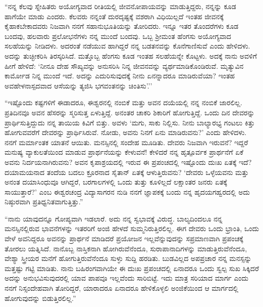 “ನನ್ನ ಕೆಲವು ಸ್ನೇಹಿತರು ಅಯೋಗ್ಯವಾದ ರೀತಿಯಲ್ಲಿ ಜೀವನೋಪಾಯವನ್ನು ಮಾಡುತ್ತಿದ್ದರು, ನನ್ನನ್ನು ಕೂಡ ಹಾಗೆಯೇ ಮಾಡು ಎಂದರು. ಕೆಲವರು ನನ್ನಂತೆ ದುರದೃಷ್ಟಕ್ಕೆ ವಶರಾಗಿ ವಿಧಿಯಿಲ್ಲದೆ ಇಂತಹ ಜೀವನಕ್ಕೆ ಕೈಹಾಕಬೇಕಾದವರು ನಿಜವಾಗಿ ನನಗೆ ಸಹಾನುಭೂತಿಯನ್ನು ತೋರಿದರು. ಇನ್ನೂ ಇತರ ತೊಂದರೆಗಳು ಕೂಡ ಬಂದವು, ಹಲವಾರು ಪ್ರಲೋಭನೆಗಳು ನನ್ನ ಮುಂದೆ ಬಂದವು. ಒಬ್ಬ ಶ‍್ರೀಮಂತ ಹೆಂಗಸು ಅಯೋಗ್ಯವಾದ ಸಲಹೆಯನ್ನು ನೀಡಿದಳು. ಅದರಂತೆ ನಡೆಯುವ ಹಾಗಿದ್ದರೆ ನನ್ನ ಬಡತನವನ್ನು ಕೊನೆಗಾಣಿಸುವೆ ಎಂದು ಹೇಳಿದಳು. ಅದನ್ನು ತುಚ್ಛೀಕರಿಸಿ ತಿರಸ್ಕರಿಸಿದೆ. ಮತ್ತೊಬ್ಬ ಹೆಂಗಸು ಕೂಡ ಇಂತಹ ಸಲಹೆಯನ್ನೇ ಕೊಟ್ಟಳು. ಅದಕ್ಕೆ ನಾನು ಅವಳಿಗೆ ಹೀಗೆ ಹೇಳಿದೆ: ‘ನೀನೂ ದೇಹ ಸೌಖ್ಯವನ್ನು ಅನುಸರಿಸಿ ನಿನ್ನ ಜೀವನವನ್ನು ವ್ಯರ್ಥಮಾಡಿಕೊಂಡಿರುವೆ. ಮೃತ್ಯುವಿನ ಕಾರ್ಮೋಡ ನಿನ್ನ ಮುಂದೆ ಇದೆ. ಅದನ್ನು ಎದುರಿಸುವುದಕ್ಕೆ ನೀನು ಏನನ್ನಾದರೂ ಮಾಡಿರುವೆಯಾ? ಇಂತಹ ಅವಹೇಳನಾಸ್ಪದವಾದ ಆಸೆಯನ್ನು ತ್ಯಜಿಸಿ ಭಗವಂತನನ್ನು ಚಿಂತಿಸು’.’’

“ಇಷ್ಟೊಂದು ಕಷ್ಟಗಳಿಗೆ ಈಡಾದರೂ, ಈಶ್ವರನಲ್ಲಿ ನಂಬಿಕೆ ಮತ್ತು ಅವನ ದಯೆಯಲ್ಲಿ ನನ್ನ ನಂಬಿಕೆ ಜಾರಲಿಲ್ಲ. ಪ್ರತಿದಿನವೂ ಅವನ ಹೆಸರನ್ನು ಸ್ಮರಿಸುತ್ತ ಏಳುತ್ತಿದ್ದೆ. ಅನಂತರ ಚಾಕರಿ ಶಿಕಾರಿಗೆ ಹೋಗುತ್ತಿದ್ದೆ. ಒಂದು ದಿನ ದೇವರನ್ನು ಪ್ರಾರ್ಥಿಸುತ್ತಿದ್ದುದು ನನ್ನ ತಾಯಿಯ ಕಿವಿಗೆ ಬಿತ್ತು. ಅವಳು ‘ಮಗು, ಸಾಕು ನಿಲ್ಲಿಸು. ನೀನು ಬಾಲ್ಯಾರಭ್ಯ ಗಂಟಲು ಕಿತ್ತು ಹೋಗುವವರೆಗೆ ದೇವರನ್ನು ಪ್ರಾರ್ಥಿಸಿರುವೆ. ನೋಡು, ಅವನು ನಿನಗೆ ಏನು ಮಾಡಿರುವನು?’ ಎಂದು ಹೇಳಿದಳು. ನನಗೆ ಮರ್ಮಾಂತಕ ಯಾತನೆ ಆಯಿತು. ಮನಸ್ಸಿನಲ್ಲಿ ಸಂದೇಹ ಮೂಡಿತು. ದೇವರು ನಿಜವಾಗಿ ಇರುವನೆ? ಇದ್ದರೆ ಮನುಷ್ಯ ವ್ಯಾಕುಲತೆಯಿಂದ ಮಾಡುವ ಪ್ರಾರ್ಥನೆಯನ್ನು ಕೇಳುವನೆ! ಕೇಳಿದರೆ ನನ್ನ ಹೃತ್ಪೂರ್ವಕ ಪ್ರಾರ್ಥನೆಗೆ ಏಕೆ ಅವನು ನಿರ್ದಯನಾಗಿರುವನು? ಅವನ ಕೃಪಾಶ್ರಯದಲ್ಲಿ ಇರುವ ಈ ಪ್ರಪಂಚದಲ್ಲಿ ಇಷ್ಟೊಂದು ದುಃಖ ಏತಕ್ಕೆ ಇದೆ? ದಯಾಮಯನಾದ ತಂದೆಯ ಬದಲು ಕ್ರೂರನಾದ ಸೈತಾನ್ ಏತಕ್ಕೆ ಆಳುತ್ತಿರುವನು? ‘ದೇವರು ಒಳ್ಳೆಯವನು ಮತ್ತು ಅನಂತ ದಯಾಸಿಂಧುವೂ ಆಗಿದ್ದರೆ, ಬರಗಾಲಗಳಲ್ಲಿ ಒಂದು ತುತ್ತು ಕೂಳಿಲ್ಲದೆ ಲಕ್ಷಾಂತರ ಜನರು ಏತಕ್ಕೆ ಸಾಯುತ್ತಾರೆ?’ ಎಂಬ ಈಶ್ವರಚಂದ್ರ ವಿದ್ಯಾಸಾಗರನ ನುಡಿ ನನಗೆ ಜ್ಞಾಪಕಕ್ಕೆ ಬಂದು ನನ್ನ ಹೃದಯಗಹ್ವರದಲ್ಲಿ ಅದು ನಿಷ್ಠುರವಾಗಿ ಪ್ರತಿಧ್ವನಿತವಾಗುತ್ತಿತ್ತು.”

\newpage

“ನಾನು ಯಾವುದನ್ನೂ ಗೋಪ್ಯವಾಗಿ ಇಡಲಾರೆ. ಅದು ನನ್ನ ಸ್ವಭಾವಕ್ಕೆ ವಿರುದ್ಧ. ಬಾಲ್ಯದಿಂದಲೂ ನನ್ನ ಮನಸ್ಸಿನಲ್ಲಿರುವ ಭಾವನೆಗಳನ್ನು ಇತರರಿಗೆ ಅಂಜಿ ಹೇಳದೆ ಸುಮ್ಮನಿರುತ್ತಿರಲಿಲ್ಲ. ಈಗ ದೇವರು ಒಂದು ಭ್ರಾಂತಿ, ಒಂದು ವೇಳೆ ಅವನಿದ್ದರೂ ಅವನನ್ನು ಪ್ರಾರ್ಥನೆ ಮಾಡಿದರೆ ಪ್ರಯೋಜನ ಇಲ್ಲವೆನ್ನುವುದನ್ನು ಸಪ್ರಮಾಣವಾಗಿ ಪ್ರಪಂಚಕ್ಕೆ ತೋರಲು ಯತ್ನಿಸಿದೆ. ನಾನೊಬ್ಬ ನಾಸ್ತಿಕನಾಗಿ ಹೋಗಿರುವೆನೆಂದೂ, ಸುರಾಪಾನಾದಿಗಳನ್ನು ಮಾಡುತ್ತಿರುವೆನೆಂದೂ, ವೇಶ್ಯಾ ಸ್ತ್ರೀಯರ ಮನೆಗೆ ಹೋಗುತ್ತಿರುವೆನೆಂದೂ ಸುಳ್ಳು ಸುದ್ದಿ ಹರಡಿತು. ಬುಡವಿಲ್ಲದ ಅಪಪ್ರಚಾರ ನನ್ನ ಮನಸ್ಸನ್ನು ಮತ್ತಷ್ಟು ಗಟ್ಟಿ ಮಾಡಿತು. ನಾನು ಬಹಿರಂಗವಾಗಿಯೇ ಈ ದುಃಖ ಪ್ರಪಂಚದಲ್ಲಿ ಏನಾದರೂ ಒಂದು ಸ್ವಲ್ಪ ಸುಖ ಸಿಕ್ಕಿದರೆ ಅದನ್ನು ಅನುಭವಿಸುವುದರಲ್ಲಿ ಯಾವ ಪಾಪವೂ ಇಲ್ಲವೆಂದು ಸಾರಿಬಿಟ್ಟೆ. ಇದು ಮಾತ್ರ ಸರಿಯಾದ ಮಾರ್ಗ ಎಂದು ನನಗೆ ನಿಸ್ಸಂದೇಹವಾಗಿ ತೋರಿದ್ದರೆ, ಯಾರಾದರೂ ಏನಾದರೂ ಹೇಳಿಕೊಳ್ಳಲಿ ಅಂಜಿಕೆಯಿಂದ ಆ ಮಾರ್ಗದಲ್ಲಿ ಹೋಗುವುದನ್ನು ಬಿಡುತ್ತಿರಲಿಲ್ಲ.”

